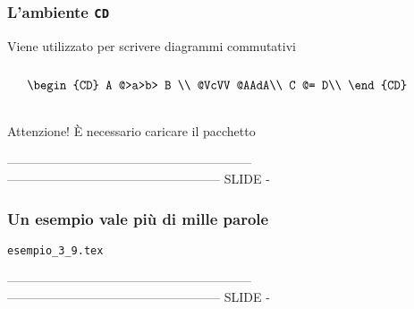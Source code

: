 \begin{frame}
  \frametitle{L'ambiente \texttt{CD}}
	Viene utilizzato per scrivere diagrammi commutativi
  \begin{columns}
	\begin{LaTeXcode}
		\\[\n
		\alert{\\begin\{CD\}}\n
		\hspace*{5ex} A	@>a>b> B \bs\bs\n
		\hspace*{5ex} @VcVV	@AAdA\bs\bs\n
		\hspace*{5ex} C 	@= D\n
		\alert{\\end\{CD\}}\n
		\\]
	\end{LaTeXcode}
	\begin{LaTeXoutput}
		\vspace{3ex}
		\[
		\begin{CD}
		A	@>a>b> B \\
		@VcVV	@AAdA\\
		C	@= D\\
		\end{CD}
		\]
		\vspace{3ex}
	\end{LaTeXoutput}
  \end{columns}
	\begin{block}{Attenzione!}
	\`E necessario caricare il pacchetto 
	\end{block}
\end{frame}
-----------------------------------------------------------
--------------------------------------------------- SLIDE -
\begin{frame}
  \frametitle{Un esempio vale pi\`u di mille parole}
	\begin{center}
		\alert{\texttt{esempio\_3\_9.tex}}
	\end{center}
\end{frame}
-----------------------------------------------------------
--------------------------------------------------- SLIDE -

